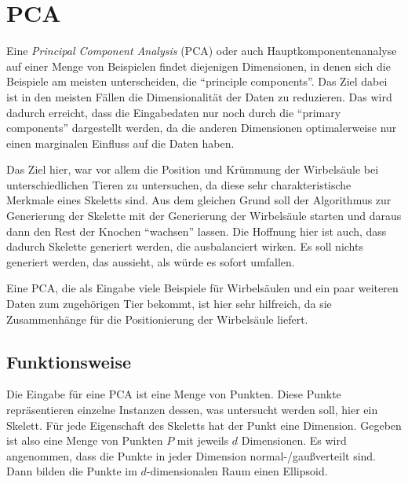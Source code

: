 \chapter{PCA}


 Eine \emph{Principal Component Analysis} (PCA) oder auch Hauptkomponentenanalyse auf einer Menge von Beispielen findet diejenigen Dimensionen, in denen sich die Beispiele am meisten unterscheiden, die "`principle components"'. Das Ziel dabei ist in den meisten Fällen die Dimensionalität der Daten zu reduzieren. Das wird dadurch erreicht, dass die Eingabedaten nur noch durch die "`primary components"' dargestellt werden, da die anderen Dimensionen optimalerweise nur einen marginalen Einfluss auf die Daten haben.
 
 Das Ziel hier, war vor allem die Position und Krümmung der Wirbelsäule bei unterschiedlichen Tieren zu untersuchen, da diese sehr charakteristische Merkmale eines Skeletts sind. Aus dem gleichen Grund soll der Algorithmus zur Generierung der Skelette mit der Generierung der Wirbelsäule starten und daraus dann den Rest der Knochen "`wachsen"' lassen.
 Die Hoffnung hier ist auch, dass dadurch Skelette generiert werden, die ausbalanciert wirken. Es soll nichts generiert werden, das aussieht, als würde es sofort umfallen. 
 
 Eine PCA, die als Eingabe viele Beispiele für Wirbelsäulen und ein paar weiteren Daten zum zugehörigen Tier bekommt, ist hier sehr hilfreich, da sie Zusammenhänge für die Positionierung der Wirbelsäule liefert.
 
 
 \section{Funktionsweise}
 
 
 Die Eingabe für eine PCA ist eine Menge von Punkten. Diese Punkte repräsentieren einzelne Instanzen dessen, was untersucht werden soll, hier ein Skelett. Für jede Eigenschaft des Skeletts hat der Punkt eine Dimension. Gegeben ist also eine Menge von Punkten $P$ mit jeweils $d$ Dimensionen. Es wird angenommen, dass die Punkte in jeder Dimension normal-/gaußverteilt sind. Dann bilden die Punkte im $d$-dimensionalen Raum einen Ellipsoid.
 
